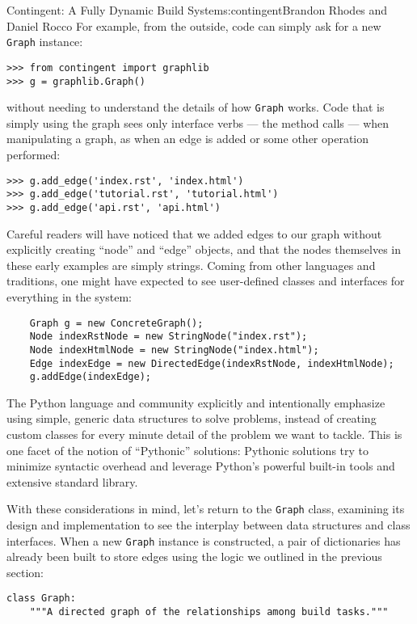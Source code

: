 \begin{aosachapter}{Contingent: A Fully Dynamic Build System}{s:contingent}{Brandon Rhodes and Daniel Rocco}
For example, from the outside, code can simply ask for a new
\texttt{Graph} instance:

\begin{verbatim}
>>> from contingent import graphlib
>>> g = graphlib.Graph()
\end{verbatim}

without needing to understand the details of how \texttt{Graph} works.
Code that is simply using the graph sees only interface verbs --- the
method calls --- when manipulating a graph, as when an edge is added or
some other operation performed:

\begin{verbatim}
>>> g.add_edge('index.rst', 'index.html')
>>> g.add_edge('tutorial.rst', 'tutorial.html')
>>> g.add_edge('api.rst', 'api.html')
\end{verbatim}

Careful readers will have noticed that we added edges to our graph
without explicitly creating ``node'' and ``edge'' objects, and that the
nodes themselves in these early examples are simply strings. Coming from
other languages and traditions, one might have expected to see
user-defined classes and interfaces for everything in the system:

\begin{verbatim}
    Graph g = new ConcreteGraph();
    Node indexRstNode = new StringNode("index.rst");
    Node indexHtmlNode = new StringNode("index.html");
    Edge indexEdge = new DirectedEdge(indexRstNode, indexHtmlNode);
    g.addEdge(indexEdge);
\end{verbatim}

The Python language and community explicitly and intentionally emphasize
using simple, generic data structures to solve problems, instead of
creating custom classes for every minute detail of the problem we want
to tackle. This is one facet of the notion of ``Pythonic'' solutions:
Pythonic solutions try to minimize syntactic overhead and leverage
Python's powerful built-in tools and extensive standard library.

With these considerations in mind, let's return to the \texttt{Graph}
class, examining its design and implementation to see the interplay
between data structures and class interfaces. When a new \texttt{Graph}
instance is constructed, a pair of dictionaries has already been built
to store edges using the logic we outlined in the previous section:

\begin{verbatim}
class Graph:
    """A directed graph of the relationships among build tasks."""


\end{verbatim}
\end{aosachapter}
